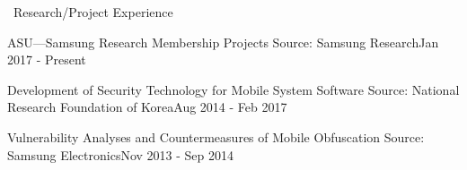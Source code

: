 \documentclass{resume} %
\begin{document}
\begin{rSection}{\faGenderless~Research/Project Experience}
	
	\begin{rSubsection3}
		{ASU---Samsung Research Membership Projects}
		{Source: Samsung Research}{Jan 2017 - Present}
	\end{rSubsection3}
	\vspace{-3mm}
	\begin{rSubsection3}
		{Development of Security Technology for Mobile System Software}
		{Source: National Research Foundation of Korea}{Aug 2014 - Feb 2017}
	\end{rSubsection3}
	\vspace{-3mm}
	\begin{rSubsection3}
		{Vulnerability Analyses and Countermeasures of Mobile Obfuscation}
		{Source: Samsung Electronics}{Nov 2013 - Sep 2014}
	\end{rSubsection3}
	\vspace{-3mm}

\end{rSection}
\end{document}
